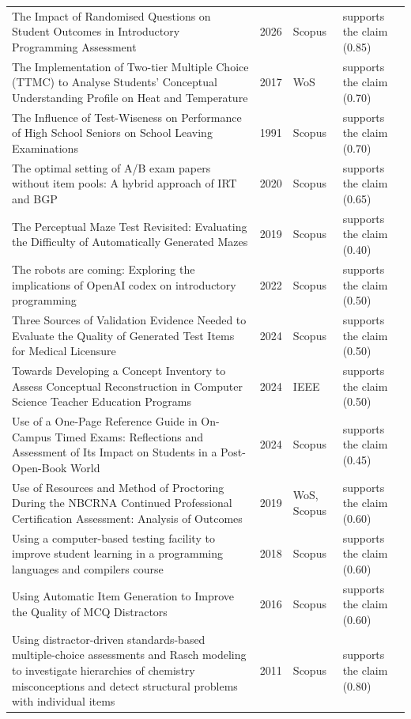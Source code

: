 \begin{longtable}{@{}%
  >{\raggedright\arraybackslash}p{}c%
  >{\raggedright\arraybackslash}p{}%
  >{\raggedright\arraybackslash}p{}@{}}
The Impact of Randomised Questions on Student Outcomes in Introductory Programming Assessment & 2026 & Scopus & supports the claim (0.85) \\
The Implementation of Two-tier Multiple Choice (TTMC) to Analyse Students' Conceptual Understanding Profile on Heat and Temperature & 2017 & WoS & supports the claim (0.70) \\
The Influence of Test-Wiseness on Performance of High School Seniors on School Leaving Examinations & 1991 & Scopus & supports the claim (0.70) \\
The optimal setting of A/B exam papers without item pools: A hybrid approach of IRT and BGP & 2020 & Scopus & supports the claim (0.65) \\
The Perceptual Maze Test Revisited: Evaluating the Difficulty of Automatically Generated Mazes & 2019 & Scopus & supports the claim (0.40) \\
The robots are coming: Exploring the implications of OpenAI codex on introductory programming & 2022 & Scopus & supports the claim (0.50) \\
Three Sources of Validation Evidence Needed to Evaluate the Quality of Generated Test Items for Medical Licensure & 2024 & Scopus & supports the claim (0.50) \\
Towards Developing a Concept Inventory to Assess Conceptual Reconstruction in Computer Science Teacher Education Programs & 2024 & IEEE & supports the claim (0.50) \\
Use of a One-Page Reference Guide in On-Campus Timed Exams: Reflections and Assessment of Its Impact on Students in a Post-Open-Book World & 2024 & Scopus & supports the claim (0.45) \\
Use of Resources and Method of Proctoring During the NBCRNA Continued Professional Certification Assessment: Analysis of Outcomes & 2019 & WoS, Scopus & supports the claim (0.60) \\
Using a computer-based testing facility to improve student learning in a programming languages and compilers course & 2018 & Scopus & supports the claim (0.60) \\
Using Automatic Item Generation to Improve the Quality of MCQ Distractors & 2016 & Scopus & supports the claim (0.60) \\
Using distractor-driven standards-based multiple-choice assessments and Rasch modeling to investigate hierarchies of chemistry misconceptions and detect structural problems with individual items & 2011 & Scopus & supports the claim (0.80) \\

\end{longtable}
